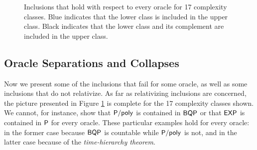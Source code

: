 \begin{figure}[!htb]
  \caption{\label{fig:mini-zoo-inclusion} Inclusions that hold with respect to 
  every oracle for 17 complexity classes. Blue indicates that the lower class is 
  included in the upper class. Black indicates that the lower class and its 
  complement are included in the upper class.}
\end{figure}

\subsection{Oracle Separations and Collapses}

Now we present some of the inclusions that fail for some oracle, as well as some 
inclusions that do not relativize. As far as relativizing inclusions are 
concerned, the picture presented in Figure \ref{fig:mini-zoo-inclusion} is 
complete for the 17 complexity classes shown. We cannot, for instance, show that 
$\mathsf{P}/\mathsf{poly}$ is contained in $\mathsf{BQP}$ or that $\mathsf{EXP}$ is contained in $\mathsf{P}$
for every oracle. These particular examples hold for every oracle: in the former 
case because $\mathsf{BQP}$ is countable while $\mathsf{P}/\mathsf{poly}$ is not, and in the latter
case because of the \textit{time-hierarchy theorem}.

